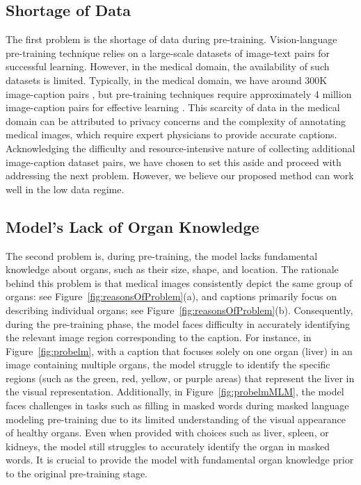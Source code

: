 \subsection{Shortage of Data}
\label{Shortage}
The first problem is the shortage of data during pre-training. Vision-language pre-training technique relies on a large-scale datasets of image-text pairs for successful learning. However, in the medical domain, the availability of such datasets is limited. Typically, in the medical domain, we have around 300K image-caption pairs \cite{subramanian-2020-medicat}, but pre-training techniques require approximately 4 million image-caption pairs for effective learning \cite{li2021align}. This scarcity of data in the medical domain can be attributed to privacy concerns and the complexity of annotating medical images, which require expert physicians to provide accurate captions. Acknowledging the difficulty and resource-intensive nature of collecting additional image-caption dataset pairs, we have chosen to set this aside and proceed with addressing the next problem. However, we believe our proposed method can work well in the low data regime.

\subsection{Model's Lack of Organ Knowledge}
\label{Lackknowledge}
The second problem is, during pre-training, the model lacks fundamental knowledge about organs, such as their size, shape, and location. The rationale behind this problem is that medical images consistently depict the same group of organs: see Figure~\ref{fig:reasonsOfProblem}(a), and captions primarily focus on describing individual organs; see Figure~\ref{fig:reasonsOfProblem}(b). Consequently, during the pre-training phase, the model faces difficulty in accurately identifying the relevant image region corresponding to the caption. For instance, in Figure~\ref{fig:probelm}, with a caption that focuses solely on one organ (liver) in an image containing multiple organs,  the model struggle to identify the specific regions (such as the green, red, yellow, or purple areas) that represent the liver in the visual representation. Additionally, in Figure~\ref{fig:probelmMLM}, the model faces challenges in tasks such as filling in masked words during masked language modeling pre-training due to its limited understanding of the visual appearance of healthy organs. Even when provided with choices such as liver, spleen, or kidneys, the model still struggles to accurately identify the organ in masked words. It is crucial to provide the model with fundamental organ knowledge prior to the original pre-training stage.

